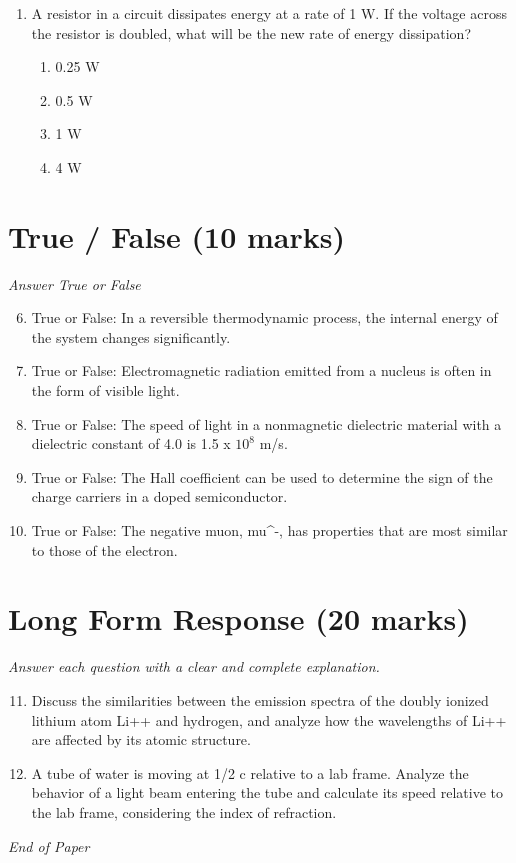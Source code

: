 \documentclass[12pt]{article}
\begin{document}
\begin{enumerate}[label=\arabic*.]
\begin{enumerate}[label=(\alph*)]
    \item 6
    \item 20
\end{enumerate}
\item A resistor in a circuit dissipates energy at a rate of 1 W. If the voltage across the resistor is doubled, what will be the new rate of energy dissipation?
\begin{enumerate}[label=(\alph*)]
    \item 0.25 W
    \item 0.5 W
    \item 1 W
    \item 4 W
\end{enumerate}
\end{enumerate}

\section*{True / False (10 marks)}
\textit{Answer True or False}
\begin{enumerate}[label=\arabic*.]
\setcounter{enumi}{5}
\item True or False: In a reversible thermodynamic process, the internal energy of the system changes significantly.
\item True or False: Electromagnetic radiation emitted from a nucleus is often in the form of visible light.
\item True or False: The speed of light in a nonmagnetic dielectric material with a dielectric constant of 4.0 is 1.5 x $10^8$ m/s.
\item True or False: The Hall coefficient can be used to determine the sign of the charge carriers in a doped semiconductor.
\item True or False: The negative muon, mu^-, has properties that are most similar to those of the electron.
\end{enumerate}

\section*{Long Form Response (20 marks)}
\textit{Answer each question with a clear and complete explanation.}
\begin{enumerate}[label=\arabic*.]
\setcounter{enumi}{10}
\item Discuss the similarities between the emission spectra of the doubly ionized lithium atom Li++ and hydrogen, and analyze how the wavelengths of Li++ are affected by its atomic structure.
\item A tube of water is moving at 1/2 c relative to a lab frame. Analyze the behavior of a light beam entering the tube and calculate its speed relative to the lab frame, considering the index of refraction.
\end{enumerate}

\vfill
\noindent\textit{End of Paper}
\end{document}
